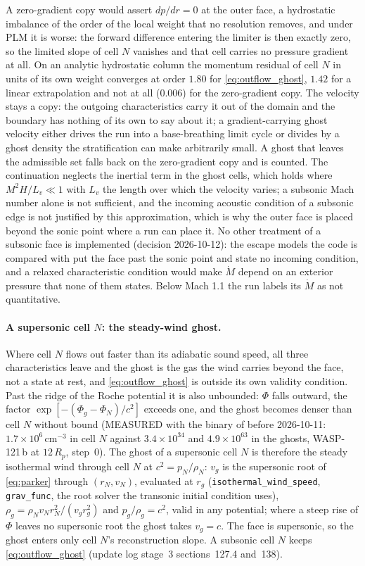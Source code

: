 A zero-gradient copy would assert $dp/dr = 0$ at the outer face, a hydrostatic
imbalance of the order of the local weight that no resolution removes, and
under PLM it is worse: the forward difference entering the limiter is then
exactly zero, so the limited slope of cell $N$ vanishes and that cell carries
no pressure gradient at all.  On an analytic hydrostatic column the momentum residual of cell $N$ in units
of its own weight converges at order $1.80$ for \eqref{eq:outflow_ghost},
$1.42$ for a linear extrapolation and not at all ($0.006$) for the
zero-gradient copy.  The velocity
stays a copy: the outgoing characteristics carry it out of the domain and the
boundary has nothing of its own to say about it; a gradient-carrying ghost
velocity either drives the run into a base-breathing limit cycle or divides by
a ghost density the stratification can make arbitrarily small.  A ghost that leaves the
admissible set falls back on the zero-gradient copy and is counted.  The
continuation neglects the inertial term in the ghost cells, which holds where
$M^2H/L_v \ll 1$ with $L_v$ the length over which the velocity varies; a
subsonic Mach number alone is not sufficient, and the incoming acoustic
condition of a subsonic edge is not justified by this approximation, which
is why the outer face is placed beyond the sonic point where a run can place
it.  No other treatment of a subsonic face is implemented (decision
2026-10-12): the escape models the code is compared with \citep{Salz2016,
Caldiroli2021} put the face past the sonic point and state no incoming
condition, and a relaxed characteristic condition would make $\dot M$ depend on
an exterior pressure that none of them states.  Below Mach 1.1 the run
labels its $\dot M$ as not quantitative.

\paragraph{A supersonic cell $N$: the steady-wind ghost.}  Where cell $N$
flows out faster than its adiabatic sound speed, all three characteristics
leave and the ghost is the gas the wind carries beyond the face, not a state
at rest, and \eqref{eq:outflow_ghost} is outside its own validity condition.
Past the ridge of the Roche potential it is also unbounded: $\Phi$ falls
outward, the factor $\exp[-(\Phi_g-\Phi_N)/c^2]$ exceeds one, and the ghost
becomes denser than cell $N$ without bound (MEASURED with the binary of
before 2026-10-11: $1.7\times10^{6}$\,cm$^{-3}$ in cell $N$ against
$3.4\times10^{34}$ and $4.9\times10^{63}$ in the ghosts, WASP-121\,b at
$12\,R_p$, step~0).  The ghost of a supersonic cell $N$ is therefore the
steady isothermal wind through cell $N$ at $c^2=p_N/\rho_N$: $v_g$ is the
supersonic root of \eqref{eq:parker} through $(r_N, v_N)$, evaluated at $r_g$
(\texttt{isothermal\_wind\_speed}, \texttt{grav\_func}, the root solver
the transonic initial condition uses), $\rho_g = \rho_N v_N r_N^2/(v_g
r_g^2)$ and $p_g/\rho_g = c^2$, valid in any potential; where a steep rise of
$\Phi$ leaves no supersonic root the ghost takes $v_g = c$.  The face is
supersonic, so the ghost enters only cell $N$'s reconstruction slope.  A
subsonic cell $N$ keeps \eqref{eq:outflow_ghost} (update log stage~3
sections~127.4 and~138).

